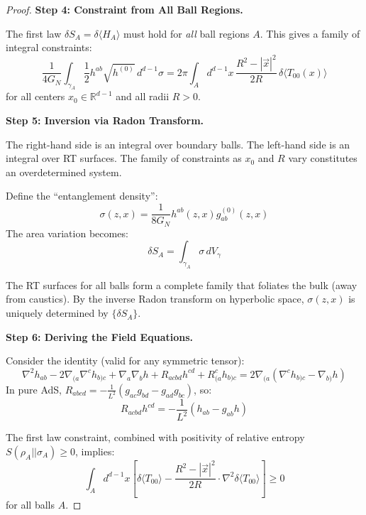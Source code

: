 \documentclass[12pt,a4paper]{article}
\begin{document}
\begin{proof}
\textbf{Step 4: Constraint from All Ball Regions.}

The first law $\delta S_A = \delta \langle H_A \rangle$ must hold for \emph{all} ball regions $A$. This gives a family of integral constraints:
\begin{equation}
\frac{1}{4G_N}\int_{\gamma_A} \frac{1}{2}h^{ab} \sqrt{h^{(0)}} \, d^{d-1}\sigma = 2\pi \int_A d^{d-1}x \, \frac{R^2 - |\vec{x}|^2}{2R} \, \delta\langle T_{00}(x) \rangle
\end{equation}
for all centers $x_0 \in \mathbb{R}^{d-1}$ and all radii $R > 0$.

\textbf{Step 5: Inversion via Radon Transform.}

The right-hand side is an integral over boundary balls. The left-hand side is an integral over RT surfaces. The family of constraints as $x_0$ and $R$ vary constitutes an overdetermined system.

Define the ``entanglement density'':
\begin{equation}
\sigma(z, x) = \frac{1}{8G_N} h^{ab}(z, x) g_{ab}^{(0)}(z, x)
\end{equation}
The area variation becomes:
\begin{equation}
\delta S_A = \int_{\gamma_A} \sigma \, dV_\gamma
\end{equation}

The RT surfaces for all balls form a complete family that foliates the bulk (away from caustics). By the inverse Radon transform on hyperbolic space, $\sigma(z, x)$ is uniquely determined by $\{\delta S_A\}$.

\textbf{Step 6: Deriving the Field Equations.}

Consider the identity (valid for any symmetric tensor):
\begin{equation}
\nabla^2 h_{ab} - 2\nabla_{(a}\nabla^c h_{b)c} + \nabla_a\nabla_b h + R_{acbd}h^{cd} + R_{(a}^c h_{b)c} = 2\nabla_{(a}(\nabla^c h_{b)c} - \nabla_{b)}h)
\end{equation}
In pure AdS, $R_{abcd} = -\frac{1}{L^2}(g_{ac}g_{bd} - g_{ad}g_{bc})$, so:
\begin{equation}
R_{acbd}h^{cd} = -\frac{1}{L^2}(h_{ab} - g_{ab}h)
\end{equation}

The first law constraint, combined with positivity of relative entropy $S(\rho_A||\sigma_A) \geq 0$, implies:
\begin{equation}
\int_A d^{d-1}x \left[ \delta\langle T_{00} \rangle - \frac{R^2 - |\vec{x}|^2}{2R} \cdot \nabla^2 \delta\langle T_{00} \rangle \right] \geq 0
\end{equation}
for all balls $A$.


\end{proof}
\end{document}
